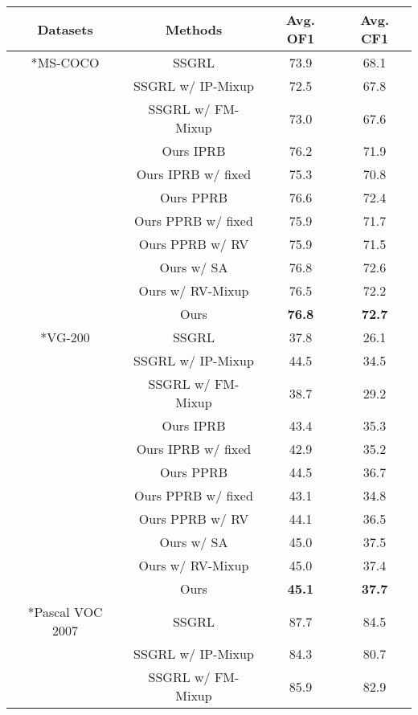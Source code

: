 \documentclass[lettersize,journal]{IEEEtran}
\begin{document}
\begin{table}[!t]
  \centering
  \begin{tabular}{c|c|cc}
  \hline
  \centering Datasets & Methods & Avg. OF1 & Avg. CF1 \\
  \hline
  \hline
  \centering \multirow{10}*{MS-COCO} & SSGRL & 73.9 & 68.1 \\
  \centering ~ & SSGRL w/ IP-Mixup & 72.5 & 67.8 \\
  \centering ~ & SSGRL w/ FM-Mixup & 73.0 & 67.6 \\
  \centering ~ & Ours IPRB & 76.2 & 71.9 \\
  \centering ~ & Ours IPRB w/ fixed  & 75.3 & 70.8 \\
  \centering ~ & Ours PPRB & 76.6 & 72.4 \\
  \centering ~ & Ours PPRB w/ fixed  & 75.9 & 71.7 \\
  \centering ~ & Ours PPRB w/ RV & 75.9 & 71.5 \\
  \centering ~ & Ours w/ SA & 76.8 & 72.6 \\
  \centering ~ & Ours w/ RV-Mixup & 76.5 & 72.2 \\
  \centering ~ & Ours & \textbf{76.8} & \textbf{72.7} \\
  \hline
  \hline
  \centering \multirow{10}*{VG-200} & SSGRL & 37.8 & 26.1 \\
  \centering ~ & SSGRL w/ IP-Mixup & 44.5 & 34.5 \\
  \centering ~ & SSGRL w/ FM-Mixup & 38.7 & 29.2 \\
  \centering ~ & Ours IPRB & 43.4 & 35.3 \\
  \centering ~ & Ours IPRB w/ fixed  & 42.9 & 35.2 \\
  \centering ~ & Ours PPRB & 44.5 & 36.7 \\
  \centering ~ & Ours PPRB w/ fixed  & 43.1 & 34.8 \\
  \centering ~ & Ours PPRB w/ RV & 44.1 & 36.5 \\
  \centering ~ & Ours w/ SA & 45.0 & 37.5 \\
  \centering ~ & Ours w/ RV-Mixup & 45.0 & 37.4 \\
  \centering ~ & Ours & \textbf{45.1} & \textbf{37.7} \\
  \hline
  \hline
  \centering \multirow{10}*{Pascal VOC 2007} & SSGRL & 87.7 & 84.5 \\
  \centering ~ & SSGRL w/ IP-Mixup & 84.3 & 80.7 \\
  \centering ~ & SSGRL w/ FM-Mixup & 85.9 & 82.9 \\

\end{tabular}
\end{table}
\end{document}
